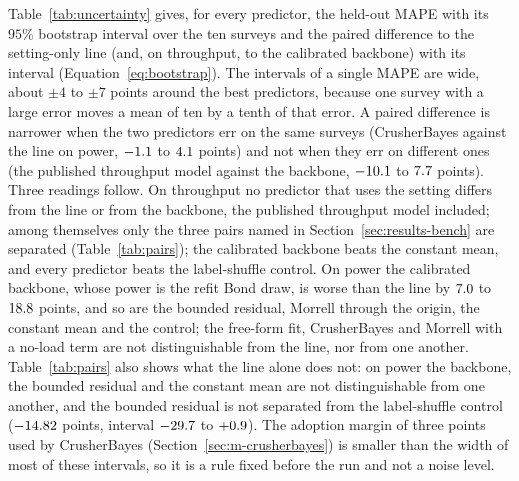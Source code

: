 Table~\ref{tab:uncertainty} gives, for every predictor, the held-out MAPE with its $95\%$ bootstrap interval over the ten surveys and the paired
difference to the setting-only line (and, on throughput, to the calibrated backbone) with its interval (Equation~\eqref{eq:bootstrap}). The
intervals of a single MAPE are wide, about $\pm4$ to $\pm7$ points around the best predictors, because one survey with a large error moves a mean of
ten by a tenth of that error. A paired difference is narrower when the two predictors err on the same surveys (CrusherBayes against the line on
power, $-1.1$ to $4.1$ points) and not when they err on different ones (the published throughput model against the backbone,
$-10.1$ to $7.7$ points). Three readings follow. On throughput no predictor that uses the setting differs from the line or
from the backbone, the published throughput model included; among themselves only the three pairs named in Section~\ref{sec:results-bench}
are separated (Table~\ref{tab:pairs}); the calibrated backbone beats the constant mean, and every predictor beats the label-shuffle control. On
power the calibrated backbone, whose power is the refit Bond draw, is worse than the line by $7.0$ to $18.8$ points, and so are the
bounded residual, Morrell through the origin, the constant mean and the control; the free-form fit, CrusherBayes and Morrell with a no-load term
are not distinguishable from the line, nor from one another. Table~\ref{tab:pairs} also shows what the line alone does not: on power the
backbone, the bounded residual and the constant mean are not distinguishable from one another, and the bounded residual is not separated
from the label-shuffle control ($-14.82$ points, interval $-29.7$ to $+0.9$). The adoption margin of three points used by CrusherBayes (Section~\ref{sec:m-crusherbayes}) is smaller than the width of most of these
intervals, so it is a rule fixed before the run and not a noise level.

\begin{table}[!t]
\centering
\caption{Held-out MAPE (\%) of every predictor on the ten HP500 surveys with its $95\%$ bootstrap interval over the surveys, and the paired
difference of its MAPE minus that of the setting-only line and, on throughput, minus that of the calibrated backbone, in points, with the
interval in brackets ($B=\uqB$ resamples, Equation~\eqref{eq:bootstrap}). The two rows of the throughput model of Rocha et al.\ are run by the
report's script with their published parameters (Equation~\eqref{eq:rocha}). Generated from \texttt{loo.json} and \texttt{crusherbayes.json}
through \texttt{heldout\_uq.py}.}
\label{tab:uncertainty}
\scriptsize
\setlength{\tabcolsep}{3pt}
\resizebox{\textwidth}{!}{}
\end{table}


